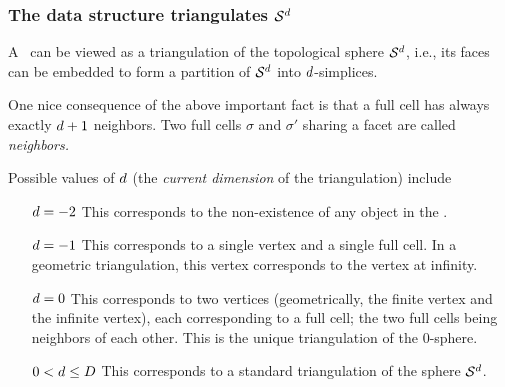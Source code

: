 %

\subsubsection{The data structure triangulates $\mathcal S^{d}$}

A \tds\ can be viewed as
a {triangulation} of the topological sphere $\mathcal S^{d}$,
i.e., its faces can be embedded to form a partition of
$\mathcal S^{d}$ into $d$-simplices. 


One nice consequence of the above important fact is that a full cell has
always exactly  $d+1$ neighbors.
Two  full cells $\sigma$ and $\sigma'$ sharing a facet are called
\em{neighbors}.


Possible values of $d$ (the \emph{current dimension} of the triangulation) include
\begin{itemize}
\item[$d=-2$] This corresponds to the non-existence of any object in
  the \tds.
\item[$d=-1$] This corresponds to a single vertex and a single full cell. In a
geometric triangulation, this vertex corresponds to the vertex at infinity.
\item[$d=0$] This corresponds to two vertices (geometrically, the finite vertex and
  the infinite vertex), each corresponding to  a full cell;
the two full cells being neighbors of each other. This is the unique
triangulation of the $0$-sphere.
\item[$0<d\le D$] This corresponds to a standard triangulation of
the sphere $\mathcal S^{d}$.
\end{itemize}

